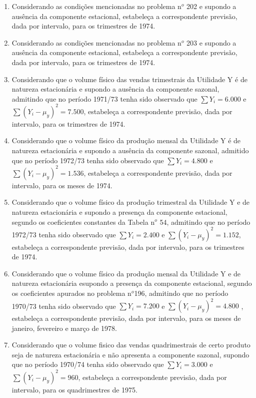 \begin{enumerate}[resume]
\item Considerando as condições mencionadas no problema n$^{o}$ 202 e supondo a ausência da componente estacional, estabeleça a correspondente previsão, dada por intervalo, para os trimestres de 1974.

\item Considerando as condições mencionadas no problema n$^{o}$ 203 e supondo a ausência da componente estacional, estabeleça a correspondente previsão, dada por intervalo, para os trimestres de 1974.

\item Considerando que o volume físico das vendas trimestrais da Utilidade Y é de natureza estacionária e supondo a ausência da componente sazonal, admitindo que no período 1971/73 tenha sido observado que $\sum Y_{i}= 6.000$ e  $\sum (Y_{i}  - \mu _{y})^{2} = 7.500$, estabeleça a correspondente previsão, dada por intervalo, para os trimestres de 1974.

\item Considerando que o volume físico da produção mensal da Utilidade Y é de natureza estacionária e supondo a ausência da componente sazonal, admitido que no período 1972/73 tenha sido observado que $\sum Y_{i}= 4.800$ e $\sum (Y_{i}  - \mu _{y})^{2} = 1.536$, estabeleça a correspondente previsão, dada por intervalo, para os meses de 1974.

\item Considerando que o volume físico da produção trimestral da Utilidade Y e de natureza estacionária e supondo a presença da componente estacional, segundo os coeficientes constantes da Tabela n$^o$ 54, admitindo que no período 1972/73 tenha sido observado que $\sum Y_{i}= 2.400$ e $\sum (Y_{i}  - \mu _{y})^{2} = 1.152$, estabeleça a correspondente previsão, dada por intervalo, para os trimestres de 1974. 

\item Considerando que o volume físico da produção mensal da Utilidade Y e de natureza estacionária esupondo a presença da componente estacional, segundo os coeficientes apurados no problema n$^o$196, admitindo que no período 1970/73 tenha sido observado que $\sum Y_{i}= 7. 200$ e $\sum (Y_{i}  - \mu _{y})^{2} =  4.800$ , estabeleça a correspondente previsão, dada por intervalo, para os meses de janeiro, fevereiro e março de 1978.

\item Considerando que o volume fisico das vendas quadrimestrais de certo produto seja de natureza estacionária e não apresenta a componente sazonal, supondo que no período 1970/74 tenha sido observado que  $\sum Y_{i} = 3.000$ e $\sum (Y_{i}  - \mu _{y})^{2} =  960$, estabeleça a correspondente previsão, dada por intervalo, para os quadrimestres de 1975.


\end{enumerate}
